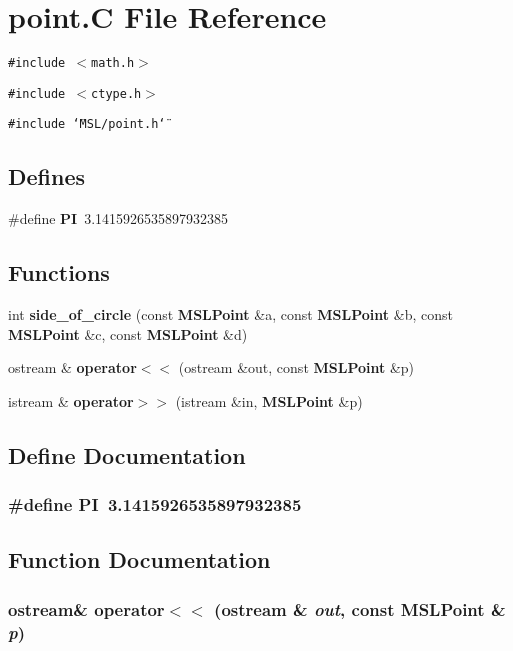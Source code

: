 \section{point.C File Reference}
\label{point_8C}
{\tt \#include $<$math.h$>$}\par
{\tt \#include $<$ctype.h$>$}\par
{\tt \#include \char`\"{}MSL/point.h\char`\"{}}\par
\subsection*{Defines}
\begin{CompactItemize}
\item 
\#define {\bf PI}\ 3.1415926535897932385
\end{CompactItemize}
\subsection*{Functions}
\begin{CompactItemize}
\item 
int {\bf side\_\-of\_\-circle} (const {\bf MSLPoint} \&a, const {\bf MSLPoint} \&b, const {\bf MSLPoint} \&c, const {\bf MSLPoint} \&d)
\item 
ostream \& {\bf operator$<$$<$} (ostream \&out, const {\bf MSLPoint} \&p)
\item 
istream \& {\bf operator$>$$>$} (istream \&in, {\bf MSLPoint} \&p)
\end{CompactItemize}


\subsection{Define Documentation}
\subsubsection{\setlength{\rightskip}{0pt plus 5cm}\#define PI\ 3.1415926535897932385}\label{point_8C_a0}




\subsection{Function Documentation}
\subsubsection{\setlength{\rightskip}{0pt plus 5cm}ostream\& operator$<$$<$ (ostream \& {\em out}, const {\bf MSLPoint} \& {\em p})}\label{point_8C_a2}


